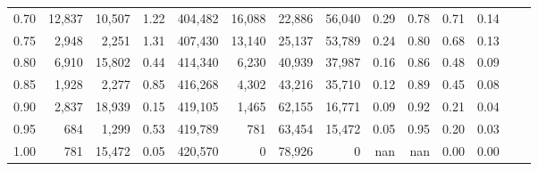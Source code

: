\begin{tabular}{rrrrrrrrrrrrrr}
0.70 &  12,837 &  10,507 &      1.22 &  404,482 &   16,088 &  22,886 &  56,040 &  0.29 &  0.78 &  0.71 &      0.14 \\
0.75 &   2,948 &   2,251 &      1.31 &  407,430 &   13,140 &  25,137 &  53,789 &  0.24 &  0.80 &  0.68 &      0.13 \\
0.80 &   6,910 &  15,802 &      0.44 &  414,340 &    6,230 &  40,939 &  37,987 &  0.16 &  0.86 &  0.48 &      0.09 \\
0.85 &   1,928 &   2,277 &      0.85 &  416,268 &    4,302 &  43,216 &  35,710 &  0.12 &  0.89 &  0.45 &      0.08 \\
0.90 &   2,837 &  18,939 &      0.15 &  419,105 &    1,465 &  62,155 &  16,771 &  0.09 &  0.92 &  0.21 &      0.04 \\
0.95 &     684 &   1,299 &      0.53 &  419,789 &      781 &  63,454 &  15,472 &  0.05 &  0.95 &  0.20 &      0.03 \\
1.00 &     781 &  15,472 &      0.05 &  420,570 &        0 &  78,926 &       0 &   nan &   nan &  0.00 &      0.00 \\
\bottomrule
\end{tabular}
